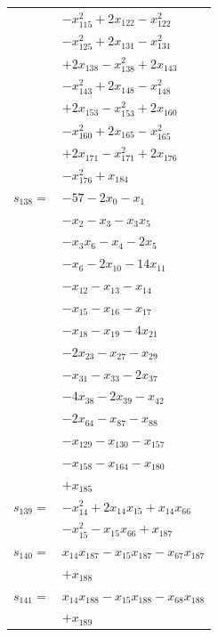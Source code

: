 \begin{longtable}{@{}r@{\;}l@{}}
 & \(\displaystyle -x_{115}^{2} +2x_{122} -x_{122}^{2}\) \\
 & \(\displaystyle -x_{125}^{2} +2x_{131} -x_{131}^{2}\) \\
 & \(\displaystyle +2x_{138} -x_{138}^{2} +2x_{143}\) \\
 & \(\displaystyle -x_{143}^{2} +2x_{148} -x_{148}^{2}\) \\
 & \(\displaystyle +2x_{153} -x_{153}^{2} +2x_{160}\) \\
 & \(\displaystyle -x_{160}^{2} +2x_{165} -x_{165}^{2}\) \\
 & \(\displaystyle +2x_{171} -x_{171}^{2} +2x_{176}\) \\
 & \(\displaystyle -x_{176}^{2} +x_{184}\) \\[3pt]
\(s_{138}=\) & \(\displaystyle -57 -2x_{0} -x_{1}\) \\
 & \(\displaystyle -x_{2} -x_{3} -x_{3}x_{5}\) \\
 & \(\displaystyle -x_{3}x_{6} -x_{4} -2x_{5}\) \\
 & \(\displaystyle -x_{6} -2x_{10} -14x_{11}\) \\
 & \(\displaystyle -x_{12} -x_{13} -x_{14}\) \\
 & \(\displaystyle -x_{15} -x_{16} -x_{17}\) \\
 & \(\displaystyle -x_{18} -x_{19} -4x_{21}\) \\
 & \(\displaystyle -2x_{23} -x_{27} -x_{29}\) \\
 & \(\displaystyle -x_{31} -x_{33} -2x_{37}\) \\
 & \(\displaystyle -4x_{38} -2x_{39} -x_{42}\) \\
 & \(\displaystyle -2x_{64} -x_{87} -x_{88}\) \\
 & \(\displaystyle -x_{129} -x_{130} -x_{157}\) \\
 & \(\displaystyle -x_{158} -x_{164} -x_{180}\) \\
 & \(\displaystyle +x_{185}\) \\[3pt]
\(s_{139}=\) & \(\displaystyle -x_{14}^{2} +2x_{14}x_{15} +x_{14}x_{66}\) \\
 & \(\displaystyle -x_{15}^{2} -x_{15}x_{66} +x_{187}\) \\[3pt]
\(s_{140}=\) & \(\displaystyle x_{14}x_{187} -x_{15}x_{187} -x_{67}x_{187}\) \\
 & \(\displaystyle +x_{188}\) \\[3pt]
\(s_{141}=\) & \(\displaystyle x_{14}x_{188} -x_{15}x_{188} -x_{68}x_{188}\) \\
 & \(\displaystyle +x_{189}\) \\[3pt]

\end{longtable}
